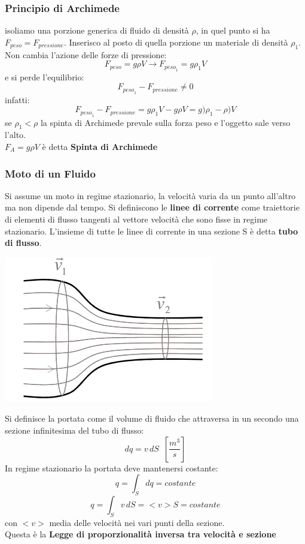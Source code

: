 \documentclass[a4paper,12pt, oneside]{book}
\begin{document}
\subsubsection{Principio di Archimede}
isoliamo una porzione generica di fluido di densità $\rho$, in quel punto si ha $F_{peso}=F_{pressione}$. Inserisco al posto di quella porzione un materiale di densità $\rho_1$. Non cambia l'azione delle forze di pressione:
$$F_{peso}=g\rho V\to F_{{peso}_1}=g\rho_1 V$$
e si perde l'equilibrio:
$$F_{{peso}_1}-F_{pressione}\neq 0$$
infatti:
$$F_{{peso}_1}-F_{pressione}=g\rho_1V-g\rho V=g)\rho_1-\rho)V$$
se $\rho_1<\rho$ la spinta di Archimede prevale sulla forza peso e l'oggetto sale verso l'alto. \\
$F_A=g\rho V$ è detta \textbf{Spinta di Archimede}
\subsubsection{Moto di un Fluido}
Si assume un moto in regime stazionario, la velocità varia da un punto all'altro ma non dipende dal tempo. Si definiscono le \textbf{linee di corrente} come traiettorie di elementi di flusso tangenti al vettore velocità che sono fisse in regime stazionario. L'insieme di tutte le linee di corrente in una sezione S è detta \textbf{tubo di flusso}.
\begin{center}
\includegraphics[scale=0.5]{img/flu5.png}
\end{center}
Si definisce la portata come il volume di fluido che attraversa in un secondo una sezione infinitesima del tubo di flusso:
$$dq=v\,dS\,\,\,\left[\frac{m^3}{s}\right]$$
In regime stazionario la portata deve mantenersi costante:
$$q=\int_S dq=costante$$
$$q=\int_S v\,dS=<v>S=costante$$
con $<v>$ media delle velocità nei vari punti della sezione.\\
Questa è la \textbf{Legge di proporzionalità inversa tra velocità e sezione}
\end{document}

